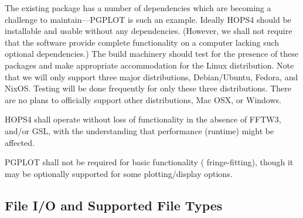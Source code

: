 The existing package has a number of dependencies which are becoming
a challenge to maintain---\acs{PGPLOT} is such an example.  Ideally
HOPS4 should be installable and usable without any dependencies.
(However, we shall not require that the software provide complete functionality
on a computer lacking such optional dependencies.) The build machinery should test
for the presence of these packages and make appropriate accommodation for
the Linux distribution. Note that we will only support three major distributions,
Debian/Ubuntu, Fedora, and NixOS. Testing will be done frequently for only these
three distributions. There are no plans to officially support other distributions,
Mac OSX, or Windows.

\begin{description}

 HOPS4 shall operate without loss of functionality in the absence of
FFTW3, and/or GSL, with the understanding that performance (runtime) might be
affected. 

 \acs{PGPLOT} shall not be required for basic functionality (\eg
fringe-fitting),
though it may be optionally supported for some plotting/display options.

\end{description}





\subsection{File I/O and Supported File Types}
\label{sec:ioreq}

